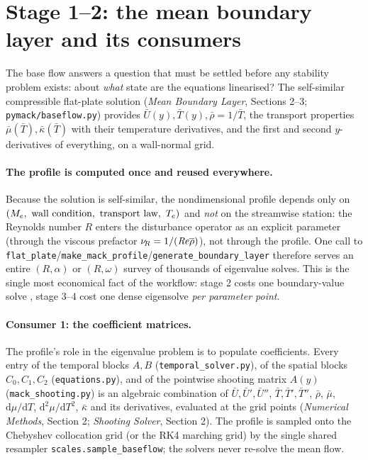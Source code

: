 \documentclass[11pt]{article}
\begin{document}
\section{Stage 1--2: the mean boundary layer and its consumers}\label{sec:baseflow}
The base flow answers a question that must be settled before any stability problem exists: about
\emph{what} state are the equations linearised? The self-similar compressible flat-plate solution
(\emph{Mean Boundary Layer}, Sections 2--3; \texttt{pymack/baseflow.py}) provides
$\bar U(y),\bar T(y),\bar\rho=1/\bar T$, the transport properties
$\bar\mu(\bar T),\bar\kappa(\bar T)$ with their temperature derivatives, and the first and second
$y$-derivatives of everything, on a wall-normal grid.

\paragraph{The profile is computed once and reused everywhere.} Because the solution is
self-similar, the nondimensional profile depends only on $(M_e,\ \text{wall condition},\
\text{transport law},\ T_e)$ and \emph{not} on the streamwise station: the Reynolds number $R$
enters the disturbance operator as an explicit parameter (through the viscous prefactor
$\nu_{\!R}=1/(\mathit{Re}\overline{\rho})$), not through the profile. One call to
\texttt{flat\_plate}/\texttt{make\_mack\_profile}/\texttt{generate\_boundary\_layer} therefore
serves an entire $(R,\alpha)$ or $(R,\omega)$ survey of thousands of eigenvalue solves. This is
the single most economical fact of the workflow: stage 2 costs one boundary-value solve
\cite{kierzenka2001}, stage 3--4 cost one dense eigensolve \emph{per parameter point}.

\paragraph{Consumer 1: the coefficient matrices.} The profile's role in the eigenvalue problem
is to populate coefficients. Every entry of the temporal blocks $A,B$
(\texttt{temporal\_solver.py}), of the spatial blocks $C_0,C_1,C_2$ (\texttt{equations.py}), and
of the pointwise shooting matrix $A(y)$ (\texttt{mack\_shooting.py}) is an algebraic combination
of $\bar U,\bar U',\bar U''$, $\bar T,\bar T',\bar T''$, $\bar\rho$, $\bar\mu$,
$\mathrm d\mu/\mathrm dT$, $\mathrm d^2\mu/\mathrm dT^2$, $\bar\kappa$ and its derivatives,
evaluated at the grid points (\emph{Numerical Methods}, Section 2; \emph{Shooting Solver},
Section 2). The profile is
sampled onto the Chebyshev collocation grid (or the RK4 marching grid) by the single shared
resampler \texttt{scales.sample\_baseflow}; the solvers never re-solve the mean flow.
\end{document}
